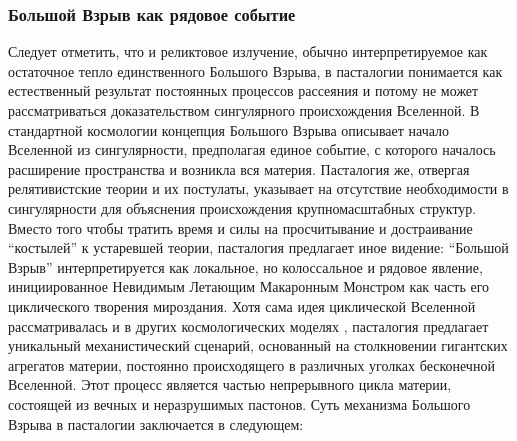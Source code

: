 \documentclass[pdflatex,sn-mathphys-num,referee]{sn-jnl}
\begin{document}
\subsubsection{Большой Взрыв как рядовое событие}\label{subsubsec:big-bang}

Следует отметить, что и реликтовое излучение, обычно интерпретируемое как остаточное тепло единственного Большого Взрыва, в пасталогии понимается как естественный результат постоянных процессов рассеяния и потому не может рассматриваться доказательством сингулярного происхождения Вселенной.
В стандартной космологии концепция Большого Взрыва описывает начало Вселенной из сингулярности, предполагая единое событие, с которого началось расширение пространства и возникла вся материя. Пасталогия же, отвергая релятивистские теории и их постулаты, указывает на отсутствие необходимости в сингулярности для объяснения происхождения крупномасштабных структур. Вместо того чтобы тратить время и силы на просчитывание и достраивание ``костылей'' к устаревшей теории, пасталогия предлагает иное видение: ``Большой Взрыв'' интерпретируется как локальное, но колоссальное и рядовое явление, инициированное Невидимым Летающим Макаронным Монстром как часть его циклического творения мироздания. Хотя сама идея циклической Вселенной рассматривалась и в других космологических моделях \cite{steinhardt2007-cyclic}, пасталогия предлагает уникальный механистический сценарий, основанный на столкновении гигантских агрегатов материи, постоянно происходящего в различных уголках бесконечной Вселенной.
Этот процесс является частью непрерывного цикла материи, состоящей из вечных и неразрушимых пастонов. Суть механизма Большого Взрыва в пасталогии заключается в следующем:
\end{document}
